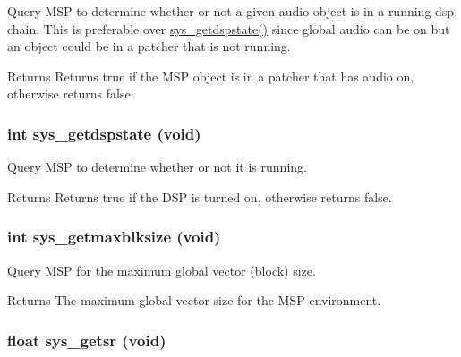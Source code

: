 Query MSP to determine whether or not a given audio object is in a running dsp chain. This is preferable over \hyperlink{group__msp_ga5705fd255a1bfcf9988db8945a1a4284}{sys\_\-getdspstate()} since global audio can be on but an object could be in a patcher that is not running.

\begin{DoxyReturn}{Returns}
Returns true if the MSP object is in a patcher that has audio on, otherwise returns false. 
\end{DoxyReturn}
\hypertarget{group__msp_ga5705fd255a1bfcf9988db8945a1a4284}{
\subsubsection[{sys\_\-getdspstate}]{\setlength{\rightskip}{0pt plus 5cm}int sys\_\-getdspstate (void)}}
\label{group__msp_ga5705fd255a1bfcf9988db8945a1a4284}


Query MSP to determine whether or not it is running. \begin{DoxyReturn}{Returns}
Returns true if the DSP is turned on, otherwise returns false. 
\end{DoxyReturn}
\hypertarget{group__msp_ga8c499862db0fcf07692989aae3d84c9e}{
\subsubsection[{sys\_\-getmaxblksize}]{\setlength{\rightskip}{0pt plus 5cm}int sys\_\-getmaxblksize (void)}}
\label{group__msp_ga8c499862db0fcf07692989aae3d84c9e}


Query MSP for the maximum global vector (block) size. \begin{DoxyReturn}{Returns}
The maximum global vector size for the MSP environment. 
\end{DoxyReturn}
\hypertarget{group__msp_ga9d492cbb6af86eaf0afb264e886072e5}{
\subsubsection[{sys\_\-getsr}]{\setlength{\rightskip}{0pt plus 5cm}float sys\_\-getsr (void)}}
\label{group__msp_ga9d492cbb6af86eaf0afb264e886072e5}


